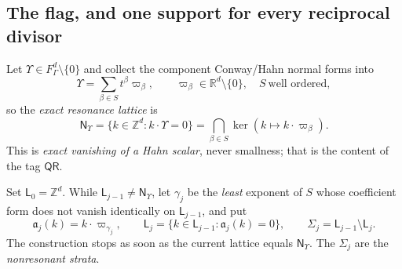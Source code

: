 \documentclass[11pt,letterpaper]{article}
\theoremstyle{definition}
\theoremstyle{remark}
\newcommand{\R}{\mathbb R}
\newcommand{\Z}{\mathbb Z}
\newcommand{\qres}{\mathsf{QR}}
\newcommand{\qlat}{\mathsf N_{\Upsilon}}
\newcommand{\fla}{\mathfrak a}
\numberwithin{equation}{section}
\begin{document}
\subsection{The flag, and one support for every reciprocal divisor}
\label{dyn:subsec:qpflag}

Let $\Upsilon\in F_\Gamma^{d}\setminus\{0\}$ and collect the component
Conway/Hahn normal forms into
\begin{equation}\label{dyn:eq:qpfrequency}
 \Upsilon=\sum_{\beta\in S}t^{\beta}\varpi_\beta,
 \qquad \varpi_\beta\in\R^{d}\setminus\{0\},\quad S\ \text{well ordered},
\end{equation}
so the \emph{exact resonance lattice} is
\begin{equation}\label{dyn:eq:qpexactlattice}
 \qlat=\{k\in\Z^{d}:k\cdot\Upsilon=0\}
 =\bigcap_{\beta\in S}\ker(k\mapsto k\cdot\varpi_\beta).
\end{equation}
This is \emph{exact vanishing of a Hahn scalar}, never smallness; that is
the content of the tag $\qres$.

Set $\mathsf L_0=\Z^{d}$. While $\mathsf L_{j-1}\ne\qlat$, let $\gamma_j$ be
the \emph{least} exponent of $S$ whose coefficient form does not vanish
identically on $\mathsf L_{j-1}$, and put
\begin{equation}\label{dyn:eq:qpflagdef}
 \fla_j(k)=k\cdot\varpi_{\gamma_j},\qquad
 \mathsf L_j=\{k\in\mathsf L_{j-1}:\fla_j(k)=0\},\qquad
 \Sigma_j=\mathsf L_{j-1}\setminus\mathsf L_j .
\end{equation}
The construction stops as soon as the current lattice equals $\qlat$. The
$\Sigma_j$ are the \emph{nonresonant strata}.
\end{document}

